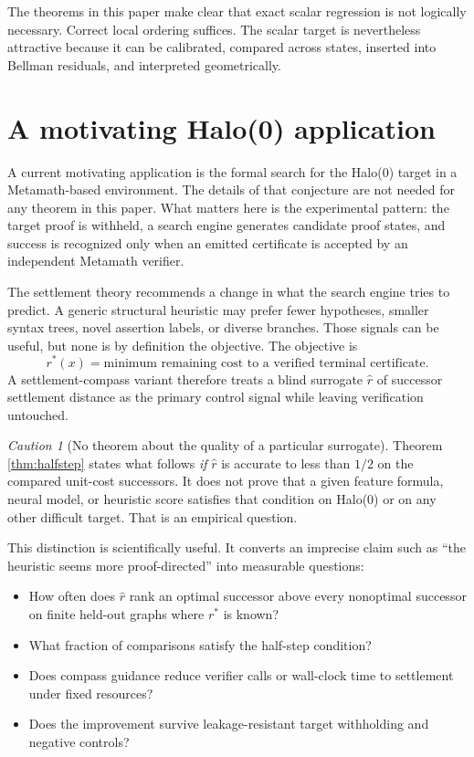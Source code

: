 \documentclass[11pt,letterpaper]{article}
\theoremstyle{remark}
\newtheorem{caution}[theorem]{Caution}
\newcommand{\rstar}{r^{\!*}}
\newcommand{\rhat}{\widehat r}
\begin{document}
The theorems in this paper make clear that exact scalar regression is not logically necessary. Correct local ordering suffices. The scalar target is nevertheless attractive because it can be calibrated, compared across states, inserted into Bellman residuals, and interpreted geometrically.

\section{A motivating Halo(0) application}\label{sec:halo}

A current motivating application is the formal search for the Halo(0) target in a Metamath-based environment. The details of that conjecture are not needed for any theorem in this paper. What matters here is the experimental pattern: the target proof is withheld, a search engine generates candidate proof states, and success is recognized only when an emitted certificate is accepted by an independent Metamath verifier.

The settlement theory recommends a change in what the search engine tries to predict. A generic structural heuristic may prefer fewer hypotheses, smaller syntax trees, novel assertion labels, or diverse branches. Those signals can be useful, but none is by definition the objective. The objective is
\[
\rstar(x)=\text{minimum remaining cost to a verified terminal certificate}.
\]
A settlement-compass variant therefore treats a blind surrogate $\rhat$ of successor settlement distance as the primary control signal while leaving verification untouched.

\begin{caution}[No theorem about the quality of a particular surrogate]
Theorem \ref{thm:halfstep} states what follows \emph{if} $\rhat$ is accurate to less than $1/2$ on the compared unit-cost successors. It does not prove that a given feature formula, neural model, or heuristic score satisfies that condition on Halo(0) or on any other difficult target. That is an empirical question.
\end{caution}

This distinction is scientifically useful. It converts an imprecise claim such as ``the heuristic seems more proof-directed'' into measurable questions:
\begin{itemize}
\item How often does $\rhat$ rank an optimal successor above every nonoptimal successor on finite held-out graphs where $\rstar$ is known?
\item What fraction of comparisons satisfy the half-step condition?
\item Does compass guidance reduce verifier calls or wall-clock time to settlement under fixed resources?
\item Does the improvement survive leakage-resistant target withholding and negative controls?
\end{itemize}
\end{document}
